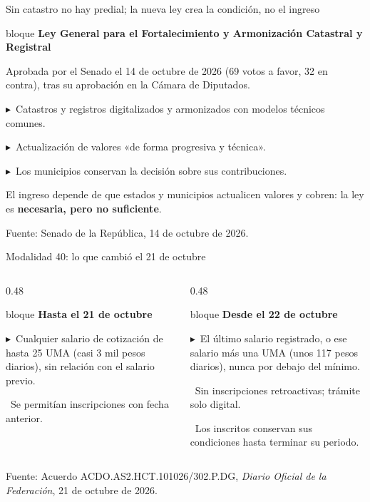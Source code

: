 \documentclass[aspectratio=169,12pt]{beamer}
\newcommand{\frente}[2]{%
    \begin{beamercolorbox}[wd=\linewidth,sep=5pt,rounded=false]{bloque}
      {\color{petroleo}\bfseries #1}\par\vspace{0.2em}\small #2
    \end{beamercolorbox}}
\newcommand{\punto}{{\color{petroleo}$\blacktriangleright$}\ }
\newcommand{\fuente}[1]{\par\vfill{\color{grisclaro}\scriptsize #1}}
\begin{document}
\begin{frame}{Sin catastro no hay predial; la nueva ley crea la condición, no el ingreso}
  \frente{Ley General para el Fortalecimiento y Armonización Catastral y Registral}{Aprobada por el Senado el 14 de octubre de 2026 (69 votos a favor, 32 en contra), tras su aprobación en la Cámara de Diputados.\par\vspace{0.5em}
    \punto Catastros y registros digitalizados y armonizados con modelos técnicos comunes.\par\vspace{0.3em}
    \punto Actualización de valores «de forma progresiva y técnica».\par\vspace{0.3em}
    \punto Los municipios conservan la decisión sobre sus contribuciones.}
  \vspace{0.6em}
  {\normalsize El ingreso depende de que estados y municipios actualicen valores y cobren: la ley es {\color{petroleo}\bfseries necesaria, pero no suficiente}.\par}
  \fuente{\raggedright Fuente: Senado de la República, 14 de octubre de 2026.\par}
\end{frame}

\begin{frame}{Modalidad 40: lo que cambió el 21 de octubre}
  \begin{columns}[T]
    \begin{column}{0.48\textwidth}
      \frente{Hasta el 21 de octubre}{\punto Cualquier salario de cotización de hasta 25 UMA (casi 3 mil pesos diarios), sin relación con el salario previo.\par\vspace{0.5em}\punto Se permitían inscripciones con fecha anterior.}
    \end{column}
    \begin{column}{0.48\textwidth}
      \frente{Desde el 22 de octubre}{\punto El último salario registrado, o ese salario más una UMA (unos 117 pesos diarios), nunca por debajo del mínimo.\par\vspace{0.5em}\punto Sin inscripciones retroactivas; trámite solo digital.\par\vspace{0.5em}\punto Los inscritos conservan sus condiciones hasta terminar su periodo.}
    \end{column}
  \end{columns}
  \fuente{\raggedright Fuente: Acuerdo ACDO.AS2.HCT.101026/302.P.DG, \emph{Diario Oficial de la Federación}, 21 de octubre de 2026.\par}
\end{frame}
\end{document}
